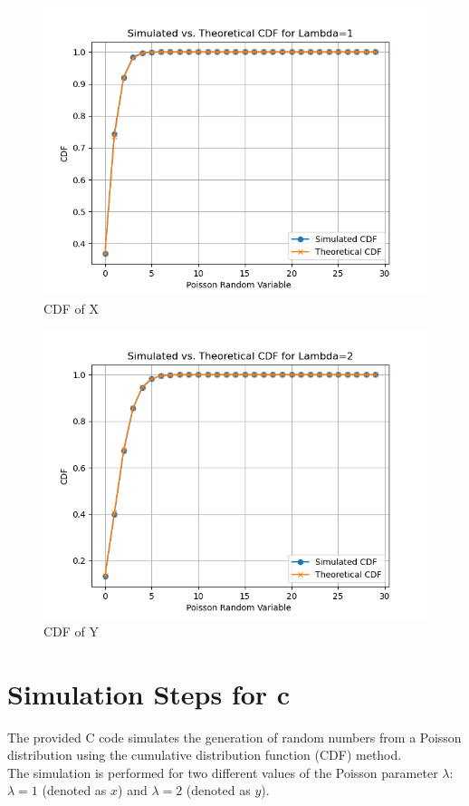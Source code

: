 \documentclass[journal,12pt,twocolumn]{IEEEtran}
\theoremstyle{remark}
\begin{document}
\begin{figure}[H]
\centering
\includegraphics[width=\columnwidth]{figs/fig1.png}
\caption{CDF of X}
\label{fig:Theory vs Simulation}
\end{figure}
\begin{figure}[H]
\centering
\includegraphics[width=\columnwidth]{figs/fig2.png}
\caption{CDF of Y}
\label{fig:Theory vs Simulation}
\end{figure}
\section{Simulation Steps for c}
The provided C code simulates the generation of random numbers from a Poisson distribution using the cumulative distribution function (CDF) method.\\ 
The simulation is performed for two different values of the Poisson parameter $\lambda$: $\lambda = 1$ (denoted as $x$) and $\lambda = 2$ (denoted as $y$).
\end{document}
